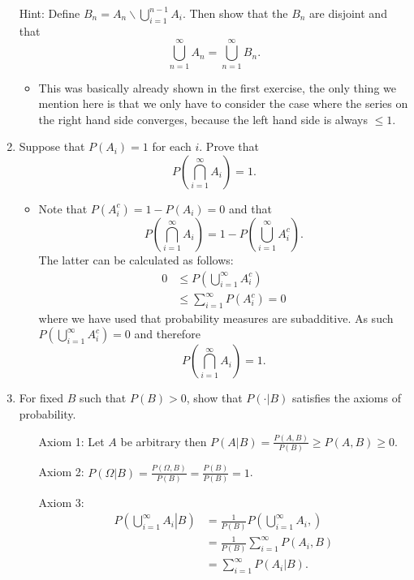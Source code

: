 \documentclass{article}
\begin{document}
\begin{enumerate}
$$	$$
	Hint: Define $B_n = A_n \backslash \bigcup_{i = 1}^{n - 1} A_i$. Then show that the $B_n$ are disjoint and that
	$$
	\bigcup_{n = 1}^\infty A_n = \bigcup_{n = 1}^\infty B_n.
	$$
	\begin{itemize}
		\item This was basically already shown in the first exercise, the only thing we mention here is that we only have to consider the case where the series on the right hand side converges, because the left hand side is always $\leq 1$.
	\end{itemize}
	\item Suppose that $P(A_i) = 1$ for each $i$. Prove that
	$$
	P\left( \bigcap_{i = 1}^\infty A_i \right) = 1.
	$$
		\begin{itemize}
			\item Note that $P(A_i^c) = 1 - P(A_i) = 0$ and that
			$$
			P\left( \bigcap_{i = 1}^\infty A_i \right) = 1 - P\left( \bigcup_{i = 1}^\infty A_i^c \right).
			$$
			The latter can be calculated as follows:
			$$
			\begin{aligned}
			0 &\leq P\left( \bigcup_{i = 1}^\infty A_i^c \right) \\
			&\leq \sum_{i = 1}^\infty P(A_i^c) = 0
			\end{aligned}
			$$
			where we have used that probability measures are subadditive. As such $P\left( \bigcup_{i = 1}^\infty A_i^c \right) = 0$ and therefore
			$$
			P\left( \bigcap_{i = 1}^\infty A_i \right) = 1.
			$$
		\end{itemize}
	\item For fixed $B$ such that $P(B) > 0$, show that $P(\cdot|B)$ satisfies the axioms of probability.
		\begin{itemize}
			\item[Axiom 1:] Let $A$ be arbitrary then $P(A|B) = \frac{P(A, B)}{P(B)} \geq P(A, B) \geq 0$.
			\item[Axiom 2:] $P(\Omega|B) = \frac{P(\Omega, B)}{P(B)} = \frac{P(B)}{P(B)} = 1$.
			\item[Axiom 3:]
			$$
			\begin{aligned}
			P\left(\left.\bigcup_{i = 1}^\infty A_i \right| B\right) &= \frac{1}{P(B)} P\left(\bigcup_{i = 1}^\infty A_i, \right) \\
			&= \frac{1}{P(B)} \sum_{i = 1}^\infty P(A_i, B) \\
			&= \sum_{i = 1}^\infty P(A_i|B).
			\end{aligned}
			$$
		\end{itemize}

\end{enumerate}
\end{document}
